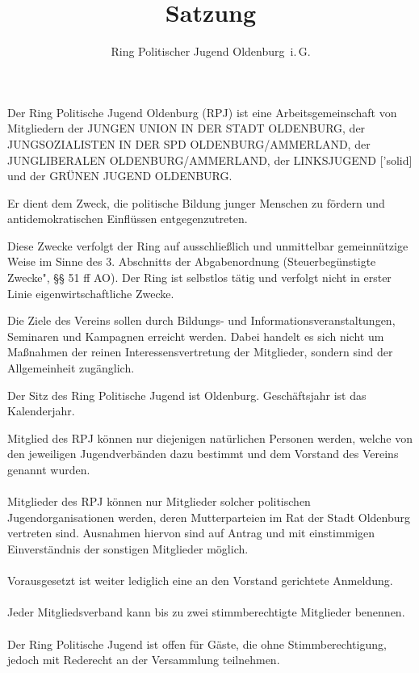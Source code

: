 \documentclass[10pt,a4paper,oneside,parskip=half]{scrartcl}
\title{Satzung}
\date{}
\author{Ring Politischer Jugend Oldenburg~i.\,G.}
\begin{document}
\maketitle

\begin{contract}

Der Ring Politische Jugend Oldenburg (RPJ) ist eine Arbeitsgemeinschaft von Mitgliedern der JUNGEN UNION IN DER STADT OLDENBURG, der JUNGSOZIALISTEN IN DER SPD OLDENBURG/AMMERLAND, der JUNGLIBERALEN OLDENBURG/AMMERLAND, der LINKSJUGEND ['solid] und der GRÜNEN JUGEND OLDENBURG.

Er dient dem Zweck, die politische Bildung junger Menschen zu fördern und antidemokratischen Einflüssen entgegenzutreten.

Diese Zwecke verfolgt der Ring auf ausschließlich und unmittelbar gemeinnützige Weise im Sinne des 3. Abschnitts der Abgabenordnung (Steuerbegünstigte Zwecke", §§ 51 ff AO). Der Ring ist selbstlos tätig und verfolgt nicht in erster Linie eigenwirtschaftliche Zwecke.

Die Ziele des Vereins sollen durch Bildungs- und Informationsveranstaltungen, Seminaren und Kampagnen erreicht werden. Dabei handelt es sich nicht um Maßnahmen der reinen Interessensvertretung der Mitglieder, sondern sind der Allgemeinheit zugänglich.

Der Sitz des Ring Politische Jugend ist Oldenburg. Geschäftsjahr ist das Kalenderjahr.

Mitglied des RPJ können nur diejenigen natürlichen Personen werden, welche von den jeweiligen Jugendverbänden dazu bestimmt und dem Vorstand des Vereins genannt wurden.\\
\\
Mitglieder des RPJ können nur Mitglieder solcher politischen Jugendorganisationen werden, deren Mutterparteien im Rat der Stadt Oldenburg vertreten sind. Ausnahmen hiervon sind auf Antrag und mit einstimmigen Einverständnis der sonstigen Mitglieder möglich.\\
\\
Vorausgesetzt ist weiter lediglich eine an den Vorstand gerichtete Anmeldung.\\
\\ 
Jeder Mitgliedsverband kann bis zu zwei stimmberechtigte Mitglieder benennen.\\
\\
Der Ring Politische Jugend ist offen für Gäste, die ohne Stimmberechtigung, jedoch mit Rederecht an der Versammlung teilnehmen.


\end{contract}
\end{document}
